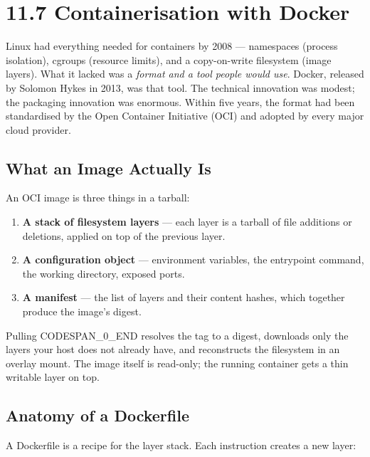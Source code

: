 \documentclass[11pt,a4paper]{book}
\begin{document}
\medskip

\section{11.7 Containerisation with Docker}

Linux had everything needed for containers by 2008 --- namespaces (process isolation), cgroups (resource limits), and a copy-on-write filesystem (image layers). What it lacked was a \textit{format and a tool people would use}. Docker, released by Solomon Hykes in 2013, was that tool. The technical innovation was modest; the packaging innovation was enormous. Within five years, the format had been standardised by the Open Container Initiative (OCI) and adopted by every major cloud provider.

\subsection{What an Image Actually Is}

An OCI image is three things in a tarball:

\begin{enumerate}
  \item \textbf{A stack of filesystem layers} --- each layer is a tarball of file additions or deletions, applied on top of the previous layer.
  \item \textbf{A configuration object} --- environment variables, the entrypoint command, the working directory, exposed ports.
  \item \textbf{A manifest} --- the list of layers and their content hashes, which together produce the image's digest.
\end{enumerate}

Pulling CODESPAN\_0\_END resolves the tag to a digest, downloads only the layers your host does not already have, and reconstructs the filesystem in an overlay mount. The image itself is read-only; the running container gets a thin writable layer on top.

\subsection{Anatomy of a Dockerfile}

A Dockerfile is a recipe for the layer stack. Each instruction creates a new layer:
\end{document}
